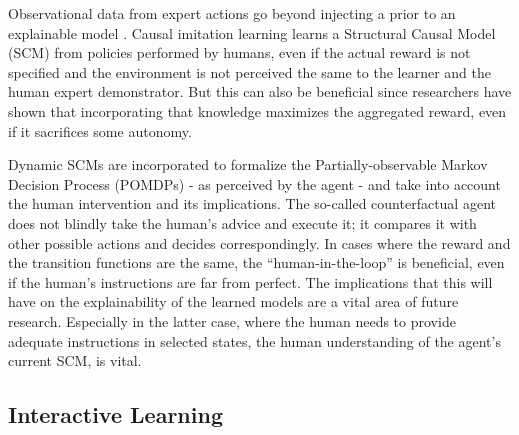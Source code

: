\documentclass[twoside,11pt]{article}
\begin{document}
Observational data from expert actions go beyond injecting a prior to an explainable model \cite{Zhang:2020:CausalImitationLearning}. Causal imitation learning learns a Structural Causal Model (SCM) \cite{Pearl:2000:ModelsReasoningInference} from policies performed by humans, even if the actual reward is not specified and the environment is not perceived the same to the learner and the human expert demonstrator. But this can also be beneficial since researchers have shown that incorporating that knowledge maximizes the aggregated reward, even if it sacrifices some autonomy. 

Dynamic SCMs are incorporated to formalize the Partially-observable Markov Decision Process (POMDPs) \cite{SuttonBarto:2018:RLIntroduction} - as perceived by the agent - and take into account the human intervention and its implications. The so-called counterfactual agent does not blindly take the human's advice and execute it; it compares it with other possible actions and decides correspondingly. In cases where the reward and the transition functions are the same, the ``human-in-the-loop'' is beneficial, even if the human's instructions are far from perfect. The implications that this will have on the explainability of the learned models are a vital area of future research. Especially in the latter case, where the human needs to provide adequate instructions in selected states, the human understanding of the agent's current SCM, is vital.  


\subsection{Interactive Learning}
\label{IRLBackground}

    
\end{document}
